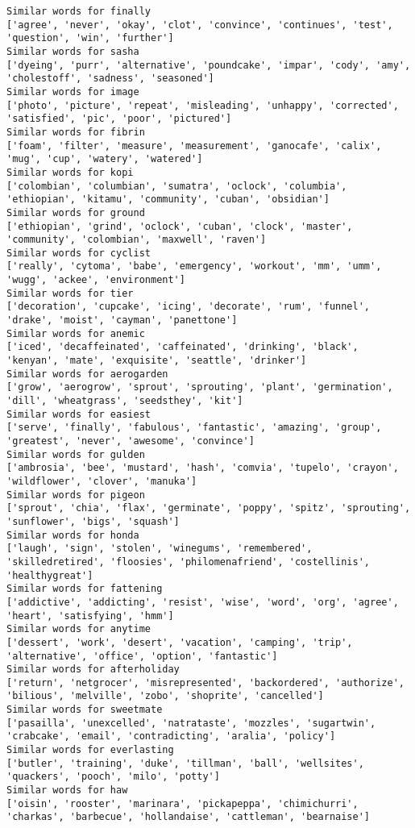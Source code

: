 \documentclass[11pt]{article}
\begin{document}
\begin{Verbatim}[commandchars=\\\{\}]
Similar words for finally
['agree', 'never', 'okay', 'clot', 'convince', 'continues', 'test', 'question', 'win', 'further']
Similar words for sasha
['dyeing', 'purr', 'alternative', 'poundcake', 'impar', 'cody', 'amy', 'cholestoff', 'sadness', 'seasoned']
Similar words for image
['photo', 'picture', 'repeat', 'misleading', 'unhappy', 'corrected', 'satisfied', 'pic', 'poor', 'pictured']
Similar words for fibrin
['foam', 'filter', 'measure', 'measurement', 'ganocafe', 'calix', 'mug', 'cup', 'watery', 'watered']
Similar words for kopi
['colombian', 'columbian', 'sumatra', 'oclock', 'columbia', 'ethiopian', 'kitamu', 'community', 'cuban', 'obsidian']
Similar words for ground
['ethiopian', 'grind', 'oclock', 'cuban', 'clock', 'master', 'community', 'colombian', 'maxwell', 'raven']
Similar words for cyclist
['really', 'cytoma', 'babe', 'emergency', 'workout', 'mm', 'umm', 'wugg', 'ackee', 'environment']
Similar words for tier
['decoration', 'cupcake', 'icing', 'decorate', 'rum', 'funnel', 'drake', 'moist', 'cayman', 'panettone']
Similar words for anemic
['iced', 'decaffeinated', 'caffeinated', 'drinking', 'black', 'kenyan', 'mate', 'exquisite', 'seattle', 'drinker']
Similar words for aerogarden
['grow', 'aerogrow', 'sprout', 'sprouting', 'plant', 'germination', 'dill', 'wheatgrass', 'seedsthey', 'kit']
Similar words for easiest
['serve', 'finally', 'fabulous', 'fantastic', 'amazing', 'group', 'greatest', 'never', 'awesome', 'convince']
Similar words for gulden
['ambrosia', 'bee', 'mustard', 'hash', 'comvia', 'tupelo', 'crayon', 'wildflower', 'clover', 'manuka']
Similar words for pigeon
['sprout', 'chia', 'flax', 'germinate', 'poppy', 'spitz', 'sprouting', 'sunflower', 'bigs', 'squash']
Similar words for honda
['laugh', 'sign', 'stolen', 'winegums', 'remembered', 'skilledretired', 'floosies', 'philomenafriend', 'costellinis', 'healthygreat']
Similar words for fattening
['addictive', 'addicting', 'resist', 'wise', 'word', 'org', 'agree', 'heart', 'satisfying', 'hmm']
Similar words for anytime
['dessert', 'work', 'desert', 'vacation', 'camping', 'trip', 'alternative', 'office', 'option', 'fantastic']
Similar words for afterholiday
['return', 'netgrocer', 'misrepresented', 'backordered', 'authorize', 'bilious', 'melville', 'zobo', 'shoprite', 'cancelled']
Similar words for sweetmate
['pasailla', 'unexcelled', 'natrataste', 'mozzles', 'sugartwin', 'crabcake', 'email', 'contradicting', 'aralia', 'policy']
Similar words for everlasting
['butler', 'training', 'duke', 'tillman', 'ball', 'wellsites', 'quackers', 'pooch', 'milo', 'potty']
Similar words for haw
['oisin', 'rooster', 'marinara', 'pickapeppa', 'chimichurri', 'charkas', 'barbecue', 'hollandaise', 'cattleman', 'bearnaise']

\end{Verbatim}
\end{document}
